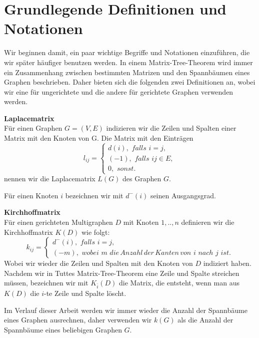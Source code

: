 \section{Grundlegende Definitionen und Notationen}
Wir beginnen damit, ein paar wichtige Begriffe und Notationen einzuführen, die wir später häufiger benutzen werden.
In einem Matrix-Tree-Theorem wird immer ein Zusammenhang zwischen bestimmten Matrizen und den Spannbäumen eines Graphen beschrieben. Daher bieten sich die folgenden zwei Definitionen an, wobei wir eine für ungerichtete und die andere für gerichtete Graphen verwenden werden.
\begin{Df}\textbf{Laplacematrix}\\
Für einen Graphen $G=(V,E)$ indizieren wir die Zeilen und Spalten einer Matrix mit den Knoten von G. Die Matrix mit den Einträgen
$$
l_{ij}=
\begin{cases}
 d(i),\, \, falls\,\, i=j,\\
 (-1), \, \, falls \,\, ij \in E,\\
 0, \,\, sonst.
\end{cases}
$$
nennen wir die Laplacematrix $L(G)$ des Graphen $G$.
\end{Df}
Für einen Knoten $i$ bezeichnen wir mit $d^{-}(i)$ seinen Ausgangsgrad.
\begin{Df}\textbf{Kirchhoffmatrix}\\
 Für einen gerichteten Multigraphen $D$ mit Knoten $1,..,n$ definieren wir die Kirchhoffmatrix $K(D)$ wie folgt:\\
 $$
k_{ij}=
\begin{cases}
 d^{-}(i),\, \, falls\,\, i=j,\\
 (-m), \, \, wobei \,\, m \,\, die\, Anzahl\, der\, Kanten\, von\,\, i\,\, nach \,\,j\,\, ist.
\end{cases}
$$
Wobei wir wieder die Zeilen und Spalten mit den Knoten von $D$ indiziert haben.\\
Nachdem wir in Tuttes Matrix-Tree-Theorem eine Zeile und Spalte streichen müssen, bezeichnen wir mit $K_{\bar{i}}(D)$ die Matrix, die entsteht, wenn man aus $K(D)$ die $i$-te Zeile und Spalte löscht.
\end{Df}
Im Verlauf dieser Arbeit werden wir immer wieder die Anzahl der Spannbäume eines Graphen ausrechnen, daher verwenden wir $\mathit{k}(G)$ als die Anzahl der Spannbäume eines beliebigen Graphen $G$.
